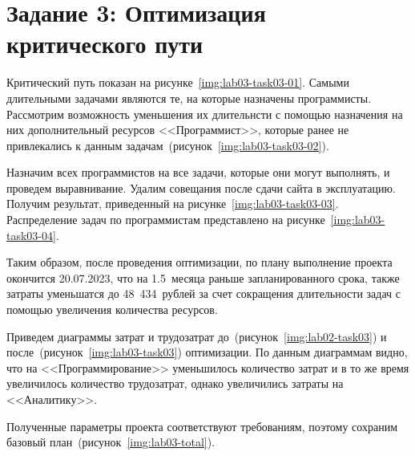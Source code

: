 \section{Задание 3: Оптимизация критического пути }

Критический путь показан на рисунке~\ref{img:lab03-task03-01}. Самыми
длительными задачами являются те, на которые назначены программисты. Рассмотрим
возможность уменьшения их длительнсти с помощью назначения на них
дополнительный ресурсов <<Программист>>, которые ранее не привлекались к данным
задачам~(рисунок~\ref{img:lab03-task03-02}).



Назначим всех программистов на все задачи, которые они могут выполнять, и
проведем выравнивание. Удалим совещания после сдачи сайта в эксплуатацию.
Получим результат, приведенный на рисунке~\ref{img:lab03-task03-03}.
Распределение задач по программистам представлено на
рисунке~\ref{img:lab03-task03-04}.



Таким образом, после проведения оптимизации, по плану выполнение проекта
окончится 20.07.2023, что на 1.5~месяца раньше запланированного срока, также
затраты уменьшатся до 48~434~рублей за счет сокращения длительности задач с
помощью увеличения количества ресурсов.

Приведем диаграммы затрат и трудозатрат до~(рисунок~\ref{img:lab02-task03}) и
после~(рисунок~\ref{img:lab03-task03}) оптимизации.  По данным диаграммам
видно, что на <<Программирование>> уменьшилось количество затрат и в то же
время увеличилось количество трудозатрат, однако увеличились затраты на
<<Аналитику>>.



Полученные параметры проекта соответствуют требованиям, поэтому сохраним
базовый план~(рисунок~\ref{img:lab03-total}).

